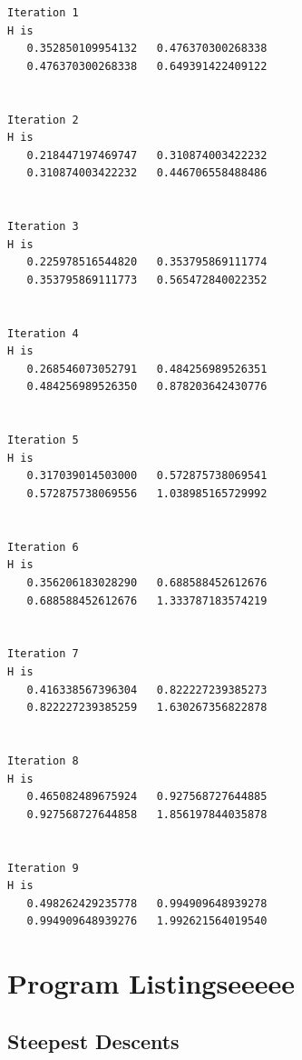 \documentclass[11pt]{article} %
\begin{document}
\begin{appendices}
\begin{verbatim}
Iteration 1
H is
   0.352850109954132   0.476370300268338
   0.476370300268338   0.649391422409122

 
Iteration 2
H is
   0.218447197469747   0.310874003422232
   0.310874003422232   0.446706558488486

 
Iteration 3
H is
   0.225978516544820   0.353795869111774
   0.353795869111773   0.565472840022352

 
Iteration 4
H is
   0.268546073052791   0.484256989526351
   0.484256989526350   0.878203642430776

 
Iteration 5
H is
   0.317039014503000   0.572875738069541
   0.572875738069556   1.038985165729992

 
Iteration 6
H is
   0.356206183028290   0.688588452612676
   0.688588452612676   1.333787183574219

 
Iteration 7
H is
   0.416338567396304   0.822227239385273
   0.822227239385259   1.630267356822878

 
Iteration 8
H is
   0.465082489675924   0.927568727644885
   0.927568727644858   1.856197844035878

 
Iteration 9
H is
   0.498262429235778   0.994909648939278
   0.994909648939276   1.992621564019540
\end{verbatim}
\end{appendices}
\clearpage
\section*{Program Listingseeeee}
\subsection*{Steepest Descents}
\end{document}
